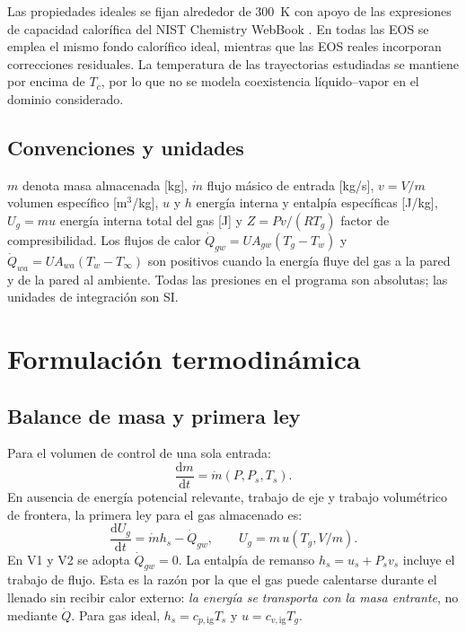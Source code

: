 \documentclass[11pt,letterpaper]{article}
\newcommand{\dd}{\mathrm{d}}
\begin{document}
Las propiedades ideales se fijan alrededor de \SI{300}{K} con apoyo de las expresiones de capacidad calorífica del NIST Chemistry WebBook \citep{NIST2026}. En todas las EOS se emplea el mismo fondo calorífico ideal, mientras que las EOS reales incorporan correcciones residuales. La temperatura de las trayectorias estudiadas se mantiene por encima de $T_c$, por lo que no se modela coexistencia líquido--vapor en el dominio considerado.

\subsection{Convenciones y unidades}
$m$ denota masa almacenada [kg], $\dot m$ flujo másico de entrada [kg/s], $v=V/m$ volumen específico [m$^3$/kg], $u$ y $h$ energía interna y entalpía específicas [J/kg], $U_g=mu$ energía interna total del gas [J] y $Z=Pv/(RT_g)$ factor de compresibilidad. Los flujos de calor $\dot Q_{gw}=UA_{gw}(T_g-T_w)$ y $\dot Q_{wa}=UA_{wa}(T_w-T_\infty)$ son positivos cuando la energía fluye del gas a la pared y de la pared al ambiente. Todas las presiones en el programa son absolutas; las unidades de integración son SI.

\section{Formulación termodinámica}
\subsection{Balance de masa y primera ley}
Para el volumen de control de una sola entrada:
\begin{equation}\boxed{\frac{\dd m}{\dd t}=\dot m(P,P_s,T_s).}\label{eq:masa}\end{equation}
En ausencia de energía potencial relevante, trabajo de eje y trabajo volumétrico de frontera, la primera ley para el gas almacenado es:
\begin{equation}\boxed{\frac{\dd U_g}{\dd t}=\dot m h_s-\dot Q_{gw},\qquad U_g=m\,u(T_g,V/m).}\label{eq:primera}\end{equation}
En V1 y V2 se adopta $\dot Q_{gw}=0$. La entalpía de remanso $h_s=u_s+P_sv_s$ incluye el trabajo de flujo. Esta es la razón por la que el gas puede calentarse durante el llenado sin recibir calor externo: \emph{la energía se transporta con la masa entrante}, no mediante $\dot Q$. Para gas ideal, $h_s=c_{p,\mathrm{ig}}T_s$ y $u=c_{v,\mathrm{ig}}T_g$.
\end{document}
